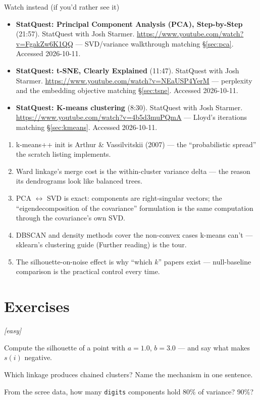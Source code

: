 \begin{rulebox}{Watch instead (if you'd rather see it)}
\begin{itemize}
\item \textbf{StatQuest: Principal Component Analysis (PCA),
  Step-by-Step} (21:57). StatQuest with Josh Starmer.
  \url{https://www.youtube.com/watch?v=FgakZw6K1QQ} --- SVD/variance
  walkthrough matching \S\ref{sec:pca}. Accessed 2026-10-11.
\item \textbf{StatQuest: t-SNE, Clearly Explained} (11:47). StatQuest
  with Josh Starmer. \url{https://www.youtube.com/watch?v=NEaUSP4YerM}
  --- perplexity and the embedding objective matching \S\ref{sec:tsne}.
  Accessed 2026-10-11.
\item \textbf{StatQuest: K-means clustering} (8:30). StatQuest with Josh
  Starmer. \url{https://www.youtube.com/watch?v=4b5d3muPQmA} --- Lloyd's
  iterations matching \S\ref{sec:kmeans}. Accessed 2026-10-11.
\end{itemize}
\end{rulebox}

\chapternotes
\begin{enumerate}
\item k-means++ init is Arthur \& Vassilvitskii (2007) --- the
  ``probabilistic spread'' the scratch listing implements.
\item Ward linkage's merge cost is the within-cluster variance delta ---
  the reason its dendrograms look like balanced trees.
\item PCA $\leftrightarrow$ SVD is exact: components are right-singular
  vectors; the ``eigendecomposition of the covariance'' formulation is
  the same computation through the covariance's own SVD.
\item DBSCAN and density methods cover the non-convex cases k-means
  can't --- sklearn's clustering guide (Further reading) is the tour.
\item The silhouette-on-noise effect is why ``which $k$'' papers exist
  --- null-baseline comparison is the practical control every time.
\end{enumerate}

\section*{Exercises}

\emph{[easy]}
\begin{exercise}
Compute the silhouette of a point with $a{=}1.0$, $b{=}3.0$ --- and say
what makes $s(i)$ negative.
\end{exercise}
\begin{exercise}
Which linkage produces chained clusters? Name the mechanism in one
sentence.
\end{exercise}
\begin{exercise}
From the scree data, how many \texttt{digits} components hold $80\%$ of
variance? $90\%$?
\end{exercise}

